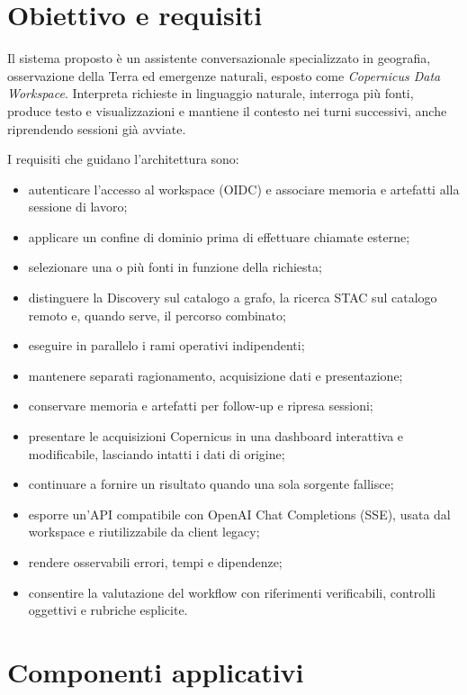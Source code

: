 \section{Obiettivo e requisiti}

Il sistema proposto è un assistente conversazionale specializzato in
geografia, osservazione della Terra ed emergenze naturali, esposto come
\emph{Copernicus Data Workspace}. Interpreta richieste in linguaggio naturale,
interroga più fonti, produce testo e visualizzazioni e mantiene il contesto nei
turni successivi, anche riprendendo sessioni già avviate.

I requisiti che guidano l'architettura sono:

\begin{itemize}
    \item autenticare l'accesso al workspace (OIDC) e associare memoria e
    artefatti alla sessione di lavoro;
    \item applicare un confine di dominio prima di effettuare chiamate esterne;
    \item selezionare una o più fonti in funzione della richiesta;
    \item distinguere la Discovery sul catalogo a grafo, la ricerca STAC sul
    catalogo remoto e, quando serve, il percorso combinato;
    \item eseguire in parallelo i rami operativi indipendenti;
    \item mantenere separati ragionamento, acquisizione dati e presentazione;
    \item conservare memoria e artefatti per follow-up e ripresa sessioni;
    \item presentare le acquisizioni Copernicus in una dashboard interattiva e
    modificabile, lasciando intatti i dati di origine;
    \item continuare a fornire un risultato quando una sola sorgente fallisce;
    \item esporre un'API compatibile con OpenAI Chat Completions (SSE), usata
    dal workspace e riutilizzabile da client legacy;
    \item rendere osservabili errori, tempi e dipendenze;
    \item consentire la valutazione del workflow con riferimenti verificabili,
    controlli oggettivi e rubriche esplicite.
\end{itemize}

\section{Componenti applicativi}

